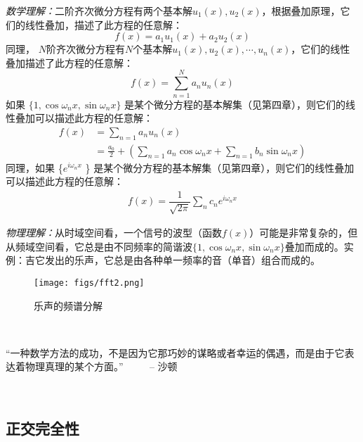 \emph{数学理解：}二阶齐次微分方程有两个基本解$u_1(x), u_2(x)$，根据叠加原理，它们的线性叠加，描述了此方程的任意解：
	\[ f(x) = a_1 u_1(x) + a_2 u_2(x)\]
	同理， $N$阶齐次微分方程有$N$个基本解$u_1(x), u_2(x), \cdots, u_n(x)$，它们的线性叠加描述了此方程的任意解：
	\[ f(x) = \sum_{n=1}^{N} a_n u_n(x)\]
	如果 $\{1, \cos \omega_n x,\sin \omega_n x \}$ 是某个微分方程的基本解集（见第四章），则它们的线性叠加可以描述此方程的任意解：
	\[ \begin{aligned} f(x) &= \sum_{n=1} a_n u_n(x) \\
		&= \frac{a_0}{2}+ \left(\sum_{n=1} a_n \cos \omega_n x + \sum_{n=1} b_n \sin \omega_n x\right)
	\end{aligned} \]
	同理，如果 \{$e^{i \omega_n x} $ \} 是某个微分方程的基本解集（见第四章），则它们的线性叠加可以描述此方程的任意解：
	\begin{equation*} 
		 \begin{aligned}
		f(x) = \dfrac{1}{\sqrt{2\pi} }\sum_n c_n e^{i\omega_n x} 
	\end{aligned}  
	\end{equation*}

\emph{物理理解：}从时域空间看，一个信号的波型（函数$f(x)$）可能是非常复杂的，但从频域空间看，它总是由不同频率的简谐波$\{1, \cos \omega_n x,\sin \omega_n x \}$叠加而成的。实例：吉它发出的乐声，它总是由各种单一频率的音（单音）组合而成的。
	\begin{figure}[ht]
		\centering
		\texttt{[image: figs/fft2.png]}
		\caption{乐声的频谱分解}
	\end{figure}

~~\\ 
\begin{hint}
“一种数学方法的成功，不是因为它那巧妙的谋略或者幸运的偶遇，而是由于它表达着物理真理的某个方面。”
$\qquad$ -- 沙顿	
\end{hint}
~\\
\subsection{正交完全性}
~\\

